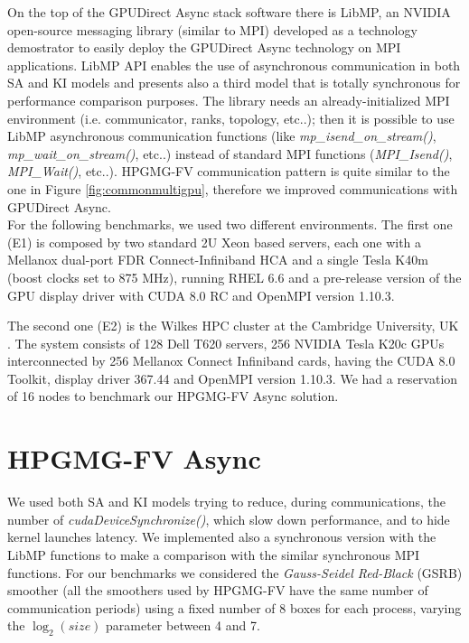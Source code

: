 \documentclass[review]{siamart1116}
\begin{document}
On the top of the GPUDirect Async stack software there is LibMP, an NVIDIA open-source messaging library (similar to MPI) developed as a technology demostrator to easily deploy the GPUDirect Async technology on MPI applications. LibMP API enables the use of asynchronous communication in both SA and KI models and presents also a third model that is totally synchronous for performance comparison purposes.
The library needs an already-initialized MPI environment (i.e. communicator, ranks, topology, etc..); then it is possible to use LibMP asynchronous communication functions (like \textit{mp\_isend\_on\_stream()}, \textit{mp\_wait\_on\_stream()}, etc..) instead of standard MPI functions (\textit{MPI\_Isend()}, \textit{MPI\_Wait()}, etc..).
HPGMG-FV communication pattern is quite similar to the one in Figure
\ref{fig:commonmultigpu}, therefore we improved communications
with GPUDirect Async.\\

For the following benchmarks, we used two different environments.
The first one (E1) is composed by two standard 2U Xeon based
servers, each one with a Mellanox dual-port FDR Connect-Infiniband HCA and a single
Tesla K40m (boost clocks set to 875 MHz), running RHEL 6.6 and a
pre-release version of the GPU display driver with CUDA 8.0 RC and OpenMPI version 1.10.3.

The second one (E2) is the Wilkes HPC cluster at the Cambridge
University, UK \cite{wilkes}. The system consists of 128 Dell T620 servers, 256 NVIDIA Tesla K20c GPUs interconnected by 256 Mellanox Connect Infiniband cards, having the CUDA 8.0 Toolkit, display driver 367.44 and OpenMPI version 1.10.3. We had a reservation of 16 nodes to benchmark our HPGMG-FV Async solution.

\section{HPGMG-FV Async}\label{sec:hpgmg_async}

We used both SA and KI models trying to reduce, during communications, the number of
\textit{cudaDeviceSynchronize()}, which slow down performance, and to
hide kernel launches latency. We implemented also a synchronous
version with the LibMP functions to make a comparison with the similar synchronous MPI functions.
For our benchmarks we considered the \emph{Gauss-Seidel Red-Black} (GSRB) smoother (all the smoothers used by HPGMG-FV have the same number of communication periods) using a fixed number of 8 boxes for each process, varying the $\log_2 (size)$ parameter between 4 and 7.
\end{document}
